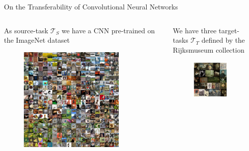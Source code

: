 \documentclass{beamer}
\begin{document}
\begin{frame}{On the Transferability of Convolutional Neural Networks}

	\begin{columns}
		\begin{column}{.5\textwidth}
			As source-task $\mathcal{T}_S$ we have a CNN pre-trained on the ImageNet dataset

			\begin{figure}
				\includegraphics[width=0.8\textwidth]{figures/imagenet}
			\end{figure}

		\end{column}
		
		\begin{column}{.5\textwidth}
			We have three target-tasks $\mathcal{T}_T$ defined by the Rijksmuseum collection

			\begin{figure}
				\includegraphics[width=0.85\textwidth]{figures/rijks}
			\end{figure}


\end{column}
\end{columns}
\end{frame}
\end{document}
